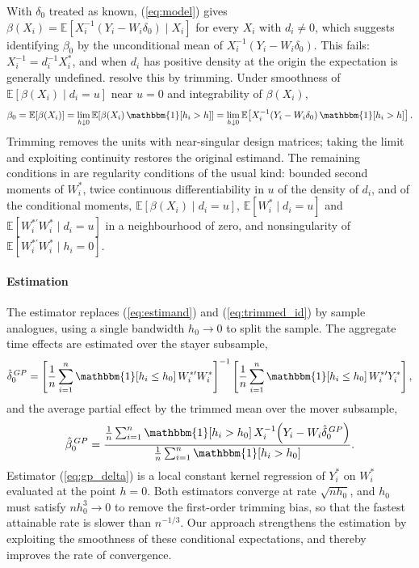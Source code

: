 \documentclass{article}
\newcommand{\E}{\mathbb{E}}
\newcommand{\I}{\mathbbm{1}}
\begin{document}
With $\delta_0$ treated as known, (\ref{eq:model}) gives $\beta(X_i)=\E[X_i^{-1}(Y_i-W_i\delta_0)\mid X_i]$ for every $X_i$ with $d_i\neq0$, which suggests identifying $\beta_0$ by the unconditional mean of $X_i^{-1}(Y_i-W_i\delta_0)$. This fails: $X_i^{-1}=d_i^{-1}X_i^{*}$, and when $d_i$ has positive density at the origin the expectation is generally undefined. \cite{grahampowell} resolve this by trimming. Under smoothness of $\E[\beta(X_i)\mid d_i=u]$ near $u=0$ and integrability of $\beta(X_i)$,
\begin{equation}\label{eq:trimmed_id}
    \beta_0 = \E[\beta(X_i)]
    = \lim_{h\downarrow0}\E\!\left[\beta(X_i)\,\I[h_i> h]\right]
    = \lim_{h\downarrow0}\E\!\left[X_i^{-1}(Y_i-W_i\delta_0)\,\I[h_i> h]\right].
\end{equation}
Trimming removes the units with near-singular design matrices; taking the limit and exploiting continuity restores the original estimand. The remaining conditions in \cite{grahampowell} are regularity conditions of the usual kind: bounded second moments of $W_i^{*}$, twice continuous differentiability in $u$ of the density of $d_i$, and of the conditional moments, $\E[\beta(X_i)\mid d_i=u]$, $\E[W_i^{*}\mid d_i=u]$ and $\E[W_i^{*\prime}W_i^{*}\mid d_i=u]$ in a neighbourhood of zero, and nonsingularity of $\E[W_i^{*\prime}W_i^{*}\mid h_i=0]$.

\paragraph{Estimation}
The estimator replaces (\ref{eq:estimand}) and (\ref{eq:trimmed_id}) by sample analogues, using a single bandwidth $h_0\to0$ to split the sample. The aggregate time effects are estimated over the stayer subsample,
\begin{equation}\label{eq:gp_delta}
    \hat{\delta}_0^{\,GP}
    = \left[\frac{1}{n}\sum_{i=1}^n \I[h_i\le h_0]\,W_i^{*\prime}W_i^{*}\right]^{-1}
      \left[\frac{1}{n}\sum_{i=1}^n \I[h_i\le h_0]\,W_i^{*\prime}Y_i^{*}\right],
\end{equation}
and the average partial effect by the trimmed mean over the mover subsample,
\begin{equation}\label{eq:gp_beta}
    \hat{\beta}_0^{\,GP}
    = \frac{\frac{1}{n}\sum_{i=1}^n \I[h_i> h_0]\,X_i^{-1}\!\left(Y_i-W_i\hat{\delta}_0^{\,GP}\right)}
           {\frac{1}{n}\sum_{i=1}^n \I[h_i> h_0]} .
\end{equation}
Estimator (\ref{eq:gp_delta}) is a local constant kernel regression of $Y_i^{*}$ on $W_i^{*}$ evaluated at the point $h=0$. Both estimators converge at rate $\sqrt{nh_0}$, and $h_0$ must satisfy $nh_0^3\to 0$ to remove the first-order trimming bias, so that the fastest attainable rate is slower than $n^{-1/3}$. Our approach strengthens the estimation by exploiting the smoothness of these conditional expectations, and thereby improves the rate of convergence.
\end{document}
